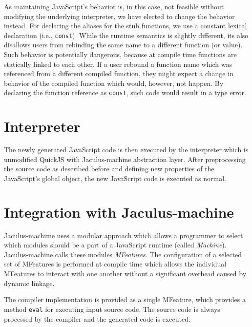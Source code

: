 As maintaining JavaScript's behavior is, in this case, not feasible without modifying the underlying interpreter, we have elected to change the behavior instead. For declaring the aliases for the stub functions, we use a constant lexical declaration (i.e., \texttt{const}). While the runtime semantics is slightly different, its also disallows users from rebinding the same name to a different function (or value). Such behavior is potentially dangerous, because at compile time functions are statically linked to each other. If a user rebound a function name which was referenced from a different compiled function, they might expect a change in behavior of the compiled function which would, however, not happen. By declaring the function reference as \texttt{const}, such code would result in a type error.


\section{Interpreter}

The newly generated JavaScript code is then executed by the interpreter which is unmodified QuickJS with Jaculus-machine abstraction layer. After preprocessing the source code as described before and defining new properties of the JavaScript's global object, the new JavaScript code is executed as normal.

\section{Integration with Jaculus-machine}

Jaculus-machime uses a modular approach which allows a programmer to select which modules should be a part of a JavaScript runtime (called \textit{Machine}). Jaculus-machine calls these modules \textit{MFeatures}. The configuration of a selected set of MFeatures is performed at compile time which allows the individual MFeatures to interact with one another without a significant overhead caused by dynamic linkage.

The compiler implementation is provided as a single MFeature, which provides a method \texttt{eval} for executing input source code. The source code is always processed by the compiler and the generated code is executed.
